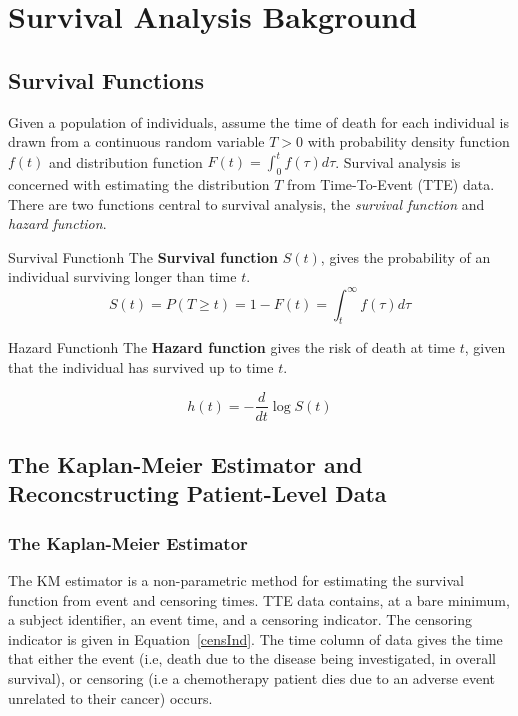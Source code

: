 \chapter{Survival Analysis Bakground}\label{survchap}

\section{Survival Functions}
Given a  population of individuals, assume the time of death for each individual is drawn from a continuous random variable $T > 0$ with probability density function $f(t)$ and distribution function $F(t) = \int_{0}^{t}f(\tau)d\tau$. Survival analysis is concerned with estimating the distribution $T$ from Time-To-Event (TTE) data. There are two functions central to survival analysis, the \textit{survival function} and \textit{hazard function}.

\begin{definition}{Survival Function}{h}
    The \textbf{Survival function} $S(t)$, gives the probability of an individual surviving longer than time $t$. 
    \begin{equation}
        S(t) = P(T \geq  t) = 1 - F(t) = \int_{t}^{\infty}f(\tau)d\tau  
    \end{equation}
\end{definition}

\begin{definition}{Hazard Function}{h}
    The \textbf{Hazard function} gives the risk of death at time $t$, given that the individual has survived up to time $t$. 
    
    \begin{equation}
        h(t) = -\frac{d}{dt}\log S(t)  
    \end{equation}
\end{definition}

\section{The Kaplan-Meier Estimator and Reconcstructing Patient-Level Data}
\subsection{The Kaplan-Meier Estimator}
The KM estimator is a non-parametric method for estimating the survival function from event and censoring times. TTE data contains, at a bare minimum, a subject identifier, an event time, and a censoring indicator. The censoring indicator is given in Equation~\ref{censInd}. The time column of data gives the time that either the event (i.e, death due to the disease being investigated, in overall survival), or censoring (i.e a chemotherapy patient dies due to an adverse event unrelated to their cancer) occurs.

